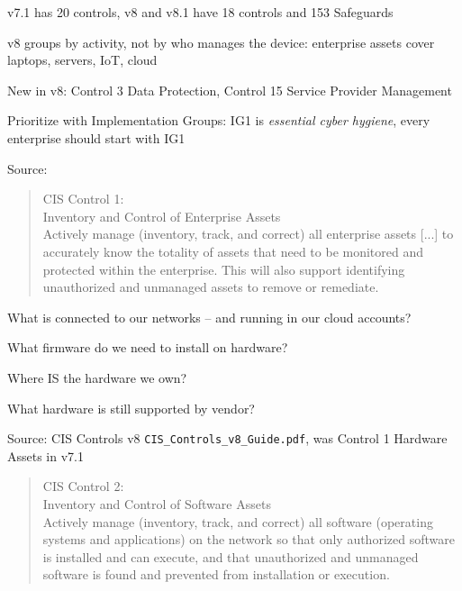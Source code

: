 \documentclass[Screen16to9,17pt]{foils}
\begin{document}
\begin{list2}
\item v7.1 has 20 controls, v8 and v8.1 have 18 controls and 153 Safeguards
\item v8 groups by activity, not by who manages the device: enterprise assets cover laptops, servers, IoT, cloud
\item New in v8: Control 3 Data Protection, Control 15 Service Provider Management
\item Prioritize with Implementation Groups: IG1 is \emph{essential cyber hygiene}, every enterprise should start with IG1
\end{list2}

{\footnotesize Source: }



\begin{quote}
CIS Control 1:\\
Inventory and Control of Enterprise Assets\\
Actively manage (inventory, track, and correct) all enterprise assets [...] to accurately know the totality of assets that need to be monitored and protected within the enterprise. This will also support identifying unauthorized and unmanaged assets to remove or remediate.
\end{quote}

\begin{list1}
\item What is connected to our networks -- and running in our cloud accounts?
\item What firmware do we need to install on hardware?
\item Where IS the hardware we own?
\item What hardware is still supported by vendor?
\end{list1}

Source: CIS Controls v8 \verb+CIS_Controls_v8_Guide.pdf+, was Control 1 Hardware Assets in v7.1



\begin{quote}
CIS Control 2:\\
Inventory and Control of Software Assets\\
Actively manage (inventory, track, and correct) all software (operating systems and applications) on the network so that only authorized software is installed and can execute, and that unauthorized and unmanaged software is found and prevented from installation or execution.
\end{quote}
\end{document}
